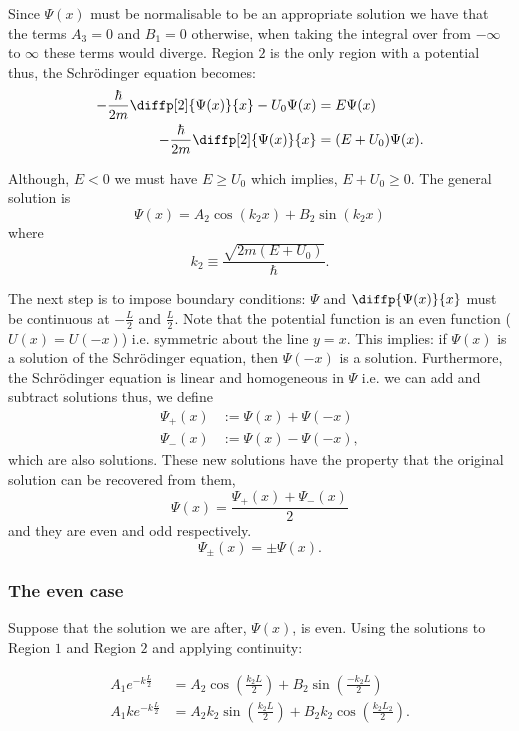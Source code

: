 \documentclass[12pt, a4paper]{article}
\begin{document}
Since \(\Psi(x)\) must be normalisable to be an appropriate solution we have that the terms \(A_3 =0\) and \(B_1 =0\) otherwise, when taking the integral over from \(-\infty\) to \(\infty\) these terms would diverge. Region \(2\) is the only region with a potential thus, the Schrödinger equation becomes:
\[\begin{aligned}
    -\frac{\hbar}{2m} \diffp[2]{\Psi(x)}{x} -U_0\Psi(x) &= E\Psi(x) \\
    -\frac{\hbar}{2m} \diffp[2]{\Psi(x)}{x} &= (E+U_0)\Psi(x).
\end{aligned}\]

Although, \(E<0\) we must have \(E\geq U_0\) which implies, \(E+U_0\geq 0\). The general solution is 
\[\Psi(x) = A_2\cos(k_2 x)+B_2\sin(k_2 x)\]
where 
\[k_2 \equiv \frac{\sqrt{2m(E+U_0)}}{\hbar}.\]

The next step is to impose boundary conditions: \(\Psi\) and \(\diffp{\Psi(x)}{x}\) must be continuous at \(-\frac{L}{2}\) and \(\frac{L}{2}\). Note that the potential function is an even function (\(U(x)=U(-x)\)) i.e. symmetric about the line \(y=x\). This implies: if \(\Psi(x)\) is a solution of the Schrödinger equation, then \(\Psi(-x)\) is a solution. Furthermore, the Schrödinger equation is linear and homogeneous in \(\Psi\) i.e. we can add and subtract solutions thus, we define 
\[\begin{aligned}
    \Psi_+(x) &:= \Psi(x)+\Psi(-x) \\
    \Psi_-(x) &:= \Psi(x) -\Psi(-x),
\end{aligned}\]
which are also solutions. These new solutions have the property that the original solution can be recovered from them,
\[\Psi(x) = \frac{\Psi_+(x)+\Psi_-(x)}{2}\]
and they are even and odd respectively.
\[\Psi_{\pm}(x) = \pm \Psi(x).\]

\subsubsection*{The even case}

Suppose that the solution we are after, \(\Psi(x)\), is even. Using the solutions to Region \(1\) and Region \(2\) and applying continuity:

\[\begin{aligned}
    A_1 e^{-k \frac{L}{2}} &= A_2 \cos \left(\frac{k_2 L}{2} \right) +B_2 \sin \left( \frac{-k_2 L}{2} \right) \\
    A_1 k e^{-k \frac{L}{2}} &= A_2 k_2 \sin \left( \frac{k_2 L}{2} \right) +B_2 k_2 \cos \left( \frac{k_2 L_2}{2} \right).
\end{aligned}\]
\end{document}
